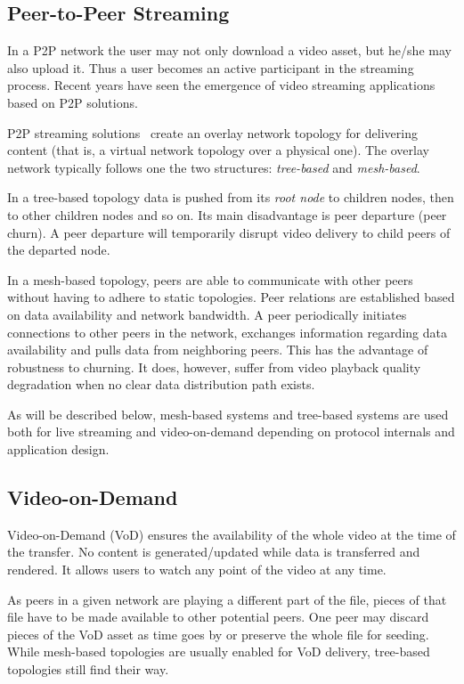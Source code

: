 \subsection{Peer-to-Peer Streaming}
\label{subsec:p2p-systems:p2p-streaming-p2p}

In a P2P network the user may not only download a video asset, but he/she may
also upload it. Thus a user becomes an active participant in the streaming
process. Recent years have seen the emergence of video streaming applications
based on P2P solutions.

P2P streaming solutions~\cite{p2p-streaming-survey} create an overlay network
topology for delivering content (that is, a virtual network topology over a
physical one).  The overlay network typically follows one the two structures:
\textit{tree-based} and \textit{mesh-based}.

In a tree-based topology data is pushed from its \textit{root node} to
children nodes, then to other children nodes and so on. Its main disadvantage
is peer departure (peer churn). A peer departure will temporarily
disrupt video delivery to child peers of the departed node.

In a mesh-based topology, peers are able to communicate with other peers without
having to adhere to static topologies. Peer relations are established based on
data availability and network bandwidth. A peer periodically initiates
connections to other peers in the network, exchanges information regarding
data availability and pulls data from neighboring peers. This has the
advantage of robustness to churning. It does, however, suffer from video
playback quality degradation when no clear data distribution path exists.

As will be described below, mesh-based systems and tree-based systems are used
both for live streaming and video-on-demand depending on protocol internals
and application design.

\subsection{Video-on-Demand}
\label{subsec:p2p-systems:vod}

Video-on-Demand (VoD) ensures the availability of the whole video at the time
of the transfer. No content is generated/updated while data is transferred and
rendered. It allows users to watch any point of the video at any time.

As peers in a given network are playing a different part of the file, pieces
of that file have to be made available to other potential peers. One peer may
discard pieces of the VoD asset as time goes by or preserve the whole file for
seeding. While mesh-based topologies are usually enabled for VoD delivery,
tree-based topologies still find their way.

